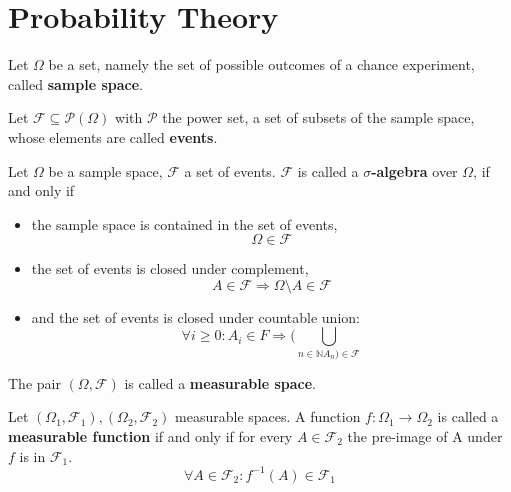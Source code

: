         \begin{definition}
        \end{definition}
        

    \section{Probability Theory}\label{\positionnumber}
        \begin{definition}
        Let $\Omega$ be a set, namely the set of possible outcomes of a chance experiment, called \textbf{sample space}.
        
        Let $\mathcal{F} \subseteq \mathcal{P}(\Omega)$ with $\mathcal{P}$ the power set, a set of subsets of the sample space, whose elements are called \textbf{events}.
        
        Let $\Omega$ be a sample space, $\mathcal{F}$ a set of events.
        $\mathcal{F}$ is called a \textbf{$\sigma$-algebra} over $\Omega$, if and only if
        \begin{itemize}
        \item the sample space is contained in the set of events,
        \[ \Omega \in \mathcal{F} \]
        \item the set of events is closed under complement,
        \[ A \in \mathcal{F} \Rightarrow \Omega \setminus A \in \mathcal F \]
        \item and the set of events is closed under countable union:
        \[ \forall i \geq 0: A_i \in F \Rightarrow (\bigcup_{n \in \mathbb{N} A_n) \in \mathcal{F}} \]
        \end{itemize}
        
        The pair $\left( \Omega, \mathcal{F} \right)$ is called a \textbf{measurable space}.

        Let $\left( \Omega_1, \mathcal{F}_1 \right), \left( \Omega_2, \mathcal{F}_2 \right)$ measurable spaces. A function $f: \Omega_1 \rightarrow \Omega_2$ is called a \textbf{measurable function} if and only if for every $A \in \mathcal{F}_2$ the pre-image of A under $f$ is in $\mathcal{F}_1$.
        \[ \forall A \in \mathcal{F}_2: f^{-1}(A) \in \mathcal{F}_1 \]
        \end{definition}

        \begin{definition}
            
        \end{definition}


